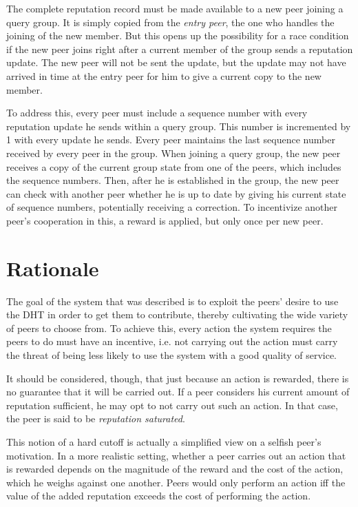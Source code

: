 The complete reputation record must be made available to a new peer joining a
query group. It is simply copied from the \emph{entry peer}, the one who handles
the joining of the new member. But this opens up the possibility for a race
condition if the new peer joins right after a current member of the group sends
a reputation update. The new peer will not be sent the update, but the update
may not have arrived in time at the entry peer for him to give a current copy to
the new member.

To address this, every peer must include a sequence number with every reputation
update he sends within a query group. This number is incremented by 1 with every
update he sends. Every peer maintains the last sequence number received by every
peer in the group. When joining a query group, the new peer receives a copy of
the current group state from one of the peers, which includes the sequence
numbers. Then, after he is established in the group, the new peer can check with
another peer whether he is up to date by giving his current state of sequence
numbers, potentially receiving a correction. To incentivize another peer's
cooperation in this, a reward is applied, but only once per new peer.

\section{Rationale}
\label{sec:desc_rationale}
The goal of the system that was described is to exploit the peers' desire to use
the DHT in order to get them to contribute, thereby cultivating the wide variety
of peers to choose from. To achieve this, every action the system requires the
peers to do must have an incentive, i.e. not carrying out the action must carry
the threat of being less likely to use the system with a good quality of
service.

It should be considered, though, that just because an action is rewarded, there
is no guarantee that it will be carried out. If a peer considers his current
amount of reputation sufficient, he may opt to not carry out such an action. In
that case, the peer is said to be \emph{reputation saturated}.

This notion of a hard cutoff is actually a simplified view on a selfish peer's
motivation. In a more realistic setting, whether a peer carries out an action
that is rewarded depends on the magnitude of the reward and the cost of the
action, which he weighs against one another. Peers would only perform an action
iff the value of the added reputation exceeds the cost of performing the action.

